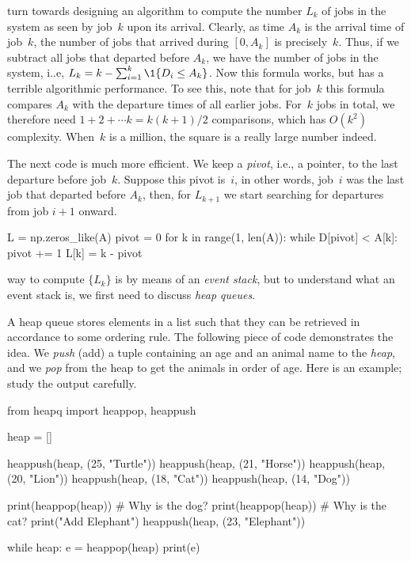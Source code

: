 \documentclass[queueing-book.tex]{subfiles}
\begin{document}
 turn towards designing an algorithm to compute the number $L_{k}$ of jobs in the system as seen by job~$k$ upon its arrival.
Clearly, as time $A_{k}$ is the arrival time of job~$k$, the number of jobs that arrived during $[0, A_{k}]$ is precisely~$k$.
Thus, if we subtract all jobs that departed before $A_{k}$, we have the number of jobs in the system, i..e, $L_{k} = k - \sum_{i=1}^{k} \1{D_i \leq A_{k}}$.
Now this formula works, but has a terrible algorithmic performance.
To see this, note that for job~$k$ this formula compares $A_{k}$ with the departure times of all earlier jobs.
For~$k$ jobs in total, we therefore need $1 + 2 + \cdots k = k(k+1)/2$ comparisons, which has $O(k^{2})$ complexity.
When~$k$ is a million, the square is a really large number indeed.

The next  code is much more efficient. We keep a \emph{pivot}, i.e., a pointer, to the last departure before job~$k$. Suppose this pivot is~$i$, in other words, job~$i$ was the last job that departed before $A_{k}$, then, for $L_{k+1}$ we start searching for departures from job $i+1$ onward.

\begin{python}
L = np.zeros_like(A)
pivot = 0
for k in range(1, len(A)):
    while D[pivot] < A[k]:
        pivot += 1
    L[k] = k - pivot
\end{python}


 way to compute $\{L_{k}\}$ is by means of an \emph{event stack}, but to understand what an event stack is, we first need to discuss \emph{heap queues}.

A heap queue stores elements in a list such that they can be retrieved in accordance to some ordering rule.
The following piece of code demonstrates the idea.
We \emph{push} (add) a tuple containing an age and an animal name to the \emph{heap}, and we \emph{pop} from the heap to get the animals in order of age.
Here is an example; study the output carefully.

\begin{pyconsole}
from heapq import heappop, heappush

heap = []

heappush(heap, (25, "Turtle"))
heappush(heap, (21, "Horse"))
heappush(heap, (20, "Lion"))
heappush(heap, (18, "Cat"))
heappush(heap, (14, "Dog"))

print(heappop(heap)) # Why is the dog?
print(heappop(heap)) # Why is the cat?
print("Add Elephant")
heappush(heap, (23, "Elephant"))

while heap:
    e = heappop(heap)
    print(e)

\end{pyconsole}
\end{document}
